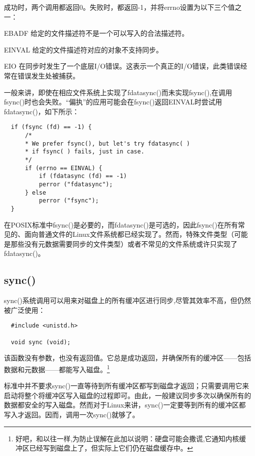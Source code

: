 成功时，两个调用都返回0。失败时，都返回-1，并将errno设置为以下三个值之一：

\begin{eqlist*}
\item [EBADF]
给定的文件描述符不是一个可以写入的合法描述符。 
\item [EINVAL]
给定的文件描述符对应的对象不支持同步。
\item [EIO]
在同步时发生了一个底层I/O错误。这表示一个真正的I/O错误，此类错误经常在错误发生处被捕获。
\end{eqlist*}

一般来讲，即使在相应文件系统上实现了fdatasync()而未实现fsync(),在调用fsync()时也会失败。“偏执”的应用可能会在fsync()返回EINVAL时尝试用fdatasync()，如下所示：

\begin{lstlisting}
  if (fsync (fd) == -1) {
      /*
      * We prefer fsync(), but let's try fdatasync( )
      * if fsync( ) fails, just in case.
      */
      if (errno == EINVAL) {
          if (fdatasync (fd) == -1)
          perror ("fdatasync");
      } else
          perror ("fsync");
  }
\end{lstlisting}

在POSIX标准中fsync()是必要的，而fdatasync()是可选的，因此fsync()在所有常见的、面向普通文件的Linux文件系统都已经实现了。然而，特殊文件类型（可能是那些没有元数据需要同步的文件类型）或者不常见的文件系统或许只实现了fdatasync()。 

\subsection{sync()}

sync()系统调用可以用来对磁盘上的所有缓冲区进行同步,尽管其效率不高，但仍然被广泛使用：

\begin{lstlisting}
  #include <unistd.h>

  void sync (void);
\end{lstlisting}

该函数没有参数，也没有返回值。它总是成功返回，并确保所有的缓冲区——包括数据和元数据——都能写入磁盘。\footnote[1]{好吧，和以往一样,为防止误解在此加以说明：硬盘可能会撒谎,它通知内核缓冲区已经写到磁盘上了，但实际上它们仍在磁盘缓存中。}

标准中并不要求sync()一直等待到所有缓冲区都写到磁盘才返回；只需要调用它来启动将整个将缓冲区写入磁盘的过程即可。由此，一般建议同步多次以确保所有的数据都安全的写入磁盘。然而对于Linux来讲，sync()一定要等到所有的缓冲区都写入才返回。因而，调用一次sync()就够了。

